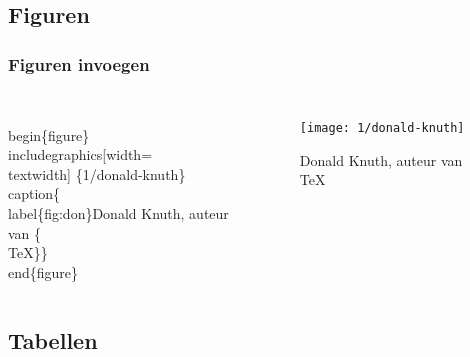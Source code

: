 \documentclass[aspectratio=169]{beamer}
\begin{document}
\subsection{Figuren}

\begin{frame}
 \frametitle{Figuren invoegen}

 \begin{columns}[c]

\begin{semiverbatim}
\alert<1>{\\begin\{figure\}}
\alert<2>{\\includegraphics[width=\\textwidth]
 \{1/donald-knuth\}}
\alert<3>{\\caption\{\alert<4>{\\label\{fig:don\}}Donald Knuth, auteur van
 \{\\TeX\}\}}
\alert<1>{\\end\{figure\}}
\end{semiverbatim}

   \begin{figure}
     \texttt{[image: 1/donald-knuth]}
     \caption{\label{fig:don}Donald Knuth, auteur van {\TeX}}
   \end{figure}

 \end{columns}

\end{frame}

\subsection{Tabellen}
\end{document}
